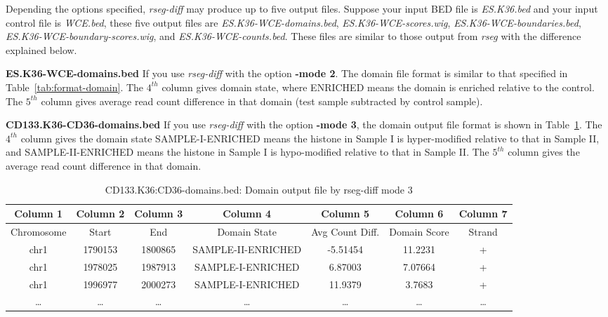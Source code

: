 \documentclass[11pt]{report}
\begin{document}
Depending the options specified, \textit{rseg-diff} may produce up to
five output files. Suppose your input BED file is \textit{ES.K36.bed}
and your input control file is \textit{WCE.bed}, these five output
files are \textit{ES.K36-WCE-domains.bed},
\textit{ES.K36-WCE-scores.wig}, \textit{ES.K36-WCE-boundaries.bed},
\textit{ES.K36-WCE-boundary-scores.wig}, and 
\textit{ES.K36-WCE-counts.bed}. These files are similar to those
output from \textit{rseg} with the difference explained below.

\textbf{ES.K36-WCE-domains.bed} If you use \textit{rseg-diff} with the
option \textbf{-mode 2}. The domain file format is similar to that
specified in Table~\ref{tab:format-domain}. The $4^{th}$ column gives
domain state, where ENRICHED means the domain is enriched relative to
the control. The $5^{th}$ column gives average read count difference
in that domain (test sample subtracted by control sample).

\textbf{CD133.K36-CD36-domains.bed} If you use \textit{rseg-diff} with
the option \textbf{-mode 3}, the domain output file format is shown in
Table~\ref{tab:format-domain-diff}. The $4^{th}$ column gives the
domain state SAMPLE-I-ENRICHED means the histone in Sample I is
hyper-modified relative to that in Sample II, and SAMPLE-II-ENRICHED
means the histone in Sample I is hypo-modified relative to that in
Sample II.  The $5^{th}$ column gives the average read count
difference in that domain.

\begin{table}[th]
  \centering
  \begin{tabular}{c c c c c c c}
Column 1 & Column 2 & Column 3 &  Column 4 & Column 5 &  Column 6  &
Column 7 \\
\hline
Chromosome  & Start & End & Domain State &  Avg Count Diff.& Domain Score &  Strand \\
\hline
chr1&    1790153& 1800865& SAMPLE-II-ENRICHED &     -5.51454   &     11.2231& + \\
chr1&    1978025& 1987913& SAMPLE-I-ENRICHED &      6.87003& 7.07664& + \\
chr1&    1996977& 2000273& SAMPLE-I-ENRICHED &      11.9379 &3.7683 & + \\
\ldots & \ldots &\ldots &\ldots &\ldots &\ldots & \ldots\\ 
\hline
  \end{tabular}
  \caption{CD133.K36:CD36-domains.bed: Domain output file  by rseg-diff mode 3}
  \label{tab:format-domain-diff}
\end{table}
\end{document}
